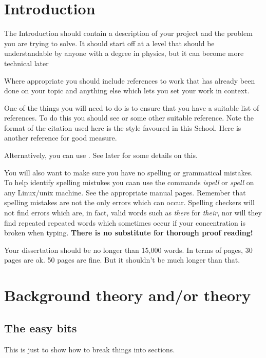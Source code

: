 \documentclass[12pt,a4paper]{report}
\begin{document}
\tableofcontents
\listoftables
\listoffigures


\chapter{Introduction}
The Introduction should contain a description of your project and the
problem you are trying to solve. It should start off at a level that
should be understandable by anyone with a degree in physics, but it
can become more technical later

Where appropriate you should include references to work that has
already been done on your topic and anything else which lets you set
your work in context.

One of the things you will need to do is to ensure that you have a
suitable list of references.  To do this you should see \cite{ref:lam}
or some other suitable reference.  Note the format of the citation used
here is the style favoured in this School.  Here is another
reference \cite{ref:bloggs} for good measure.

Alternatively, you can use \BibTeX. See later for some details on this.

You will also want to make sure you have no spelling or grammatical
mistakes. To help identify spelling mistukes you caan use the
commands \emph{ispell} or \emph{spell} on any Linux/unix machine. See
the appropriate manual pages. Remember that spelling mistakes are not
the only errors which can occur. Spelling checkers will not find
errors which are, in fact, valid words such as \emph{there} for {\em
  their}, nor will they find repeated repeated words which sometimes
occur if your concentration is broken when typing. \textbf{There is no
  substitute for thorough proof reading!}

Your dissertation should be no longer than 15,000 words. In terms of
pages, 30 pages are ok. 50 pages are fine. But it shouldn't be
much longer than that.


\chapter{Background theory and/or theory}

\section{The easy bits}
This is just to show how to break things into sections.
\end{document}
